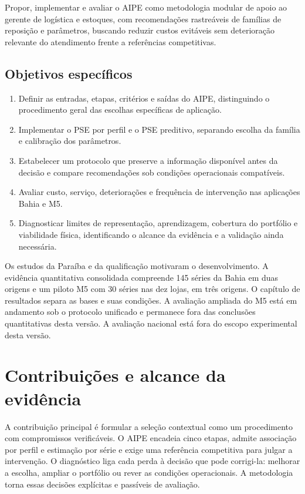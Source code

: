 Propor, implementar e avaliar o AIPE como metodologia modular de apoio ao gerente de logística e estoques, com recomendações rastreáveis de famílias de reposição e parâmetros, buscando reduzir custos evitáveis sem deterioração relevante do atendimento frente a referências competitivas.

\subsection*{Objetivos específicos}

\begin{enumerate}
  \item Definir as entradas, etapas, critérios e saídas do AIPE, distinguindo o procedimento geral das escolhas específicas de aplicação.
  \item Implementar o PSE por perfil e o PSE preditivo, separando escolha da família e calibração dos parâmetros.
  \item Estabelecer um protocolo que preserve a informação disponível antes da decisão e compare recomendações sob condições operacionais compatíveis.
  \item Avaliar custo, serviço, deteriorações e frequência de intervenção nas aplicações Bahia e M5.
  \item Diagnosticar limites de representação, aprendizagem, cobertura do portfólio e viabilidade física, identificando o alcance da evidência e a validação ainda necessária.
\end{enumerate}

Os estudos da Paraíba e da qualificação motivaram o desenvolvimento. A evidência quantitativa consolidada compreende 145 séries da Bahia em duas origens e um piloto M5 com 30 séries nas dez lojas, em três origens. O capítulo de resultados separa as bases e suas condições. A avaliação ampliada do M5 está em andamento sob o protocolo unificado e permanece fora das conclusões quantitativas desta versão. A avaliação nacional está fora do escopo experimental desta versão.

\section{Contribuições e alcance da evidência}

A contribuição principal é formular a seleção contextual como um procedimento com compromissos verificáveis. O AIPE encadeia cinco etapas, admite associação por perfil e estimação por série e exige uma referência competitiva para julgar a intervenção. O diagnóstico liga cada perda à decisão que pode corrigi-la: melhorar a escolha, ampliar o portfólio ou rever as condições operacionais. A metodologia torna essas decisões explícitas e passíveis de avaliação.

